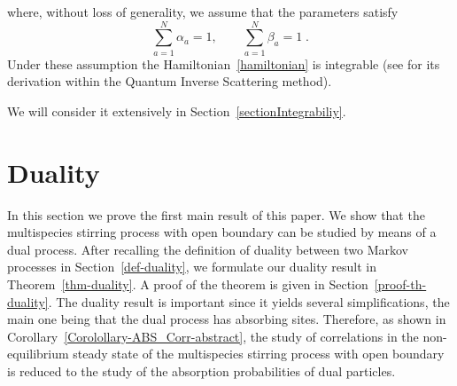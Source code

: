 \documentclass[10pt]{article}
\numberwithin{equation}{section}
\numberwithin{equation}{subsection}
\begin{document}
where, without loss of generality,  we assume that the parameters satisfy
\begin{equation}\label{ratesConditions}
	\sum_{a=1}^{N}\alpha_{a}=1,\qquad\sum_{a=1}^{N}\beta_{a}=1\;.
\end{equation} 
Under these assumption the Hamiltonian~\ref{hamiltonian} is integrable (see \cite{vanicat2017exact} for its derivation within the Quantum Inverse Scattering method). 

We will consider it extensively in Section~\ref{sectionIntegrabiliy}.

\section{Duality}\label{sectionDuality}
In this section we prove the first main result of this paper. We show that the multispecies stirring process with open boundary
can be studied by means of a dual process. After recalling the definition of duality between two
Markov processes in Section~\ref{def-duality}, we formulate our duality result  in Theorem~\ref{thm-duality}. A proof of the theorem is given in Section~\ref{proof-th-duality}.
The duality result is important since it yields several simplifications, the main one being that the
dual process has absorbing sites. Therefore, as shown in Corollary~\ref{Corolollary-ABS_Corr-abstract}, the study of correlations in the non-equilibrium steady state of the multispecies stirring process with open boundary
is reduced to the study of the absorption probabilities of dual particles.
\end{document}
